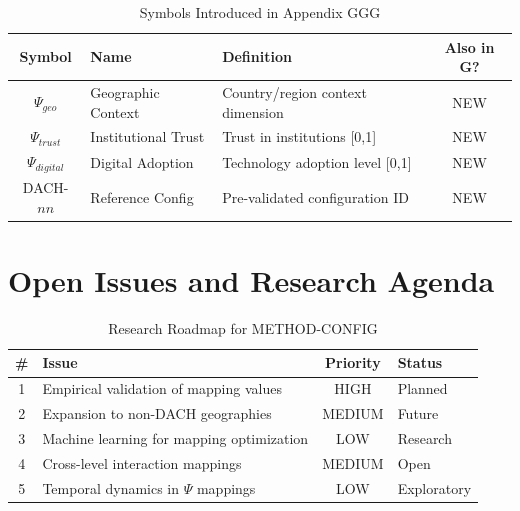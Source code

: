 \vspace{0.5em}

\begin{table}[htbp]
\centering
\caption{Symbols Introduced in Appendix GGG}
\label{tab:ggg-symbols}
\renewcommand{\arraystretch}{1.3}
\begin{tabular}{@{}clp{6cm}c@{}}
\toprule
\textbf{Symbol} & \textbf{Name} & \textbf{Definition} & \textbf{Also in G?} \\
\midrule
$\Psi_{geo}$ & Geographic Context & Country/region context dimension & NEW \\
$\Psi_{trust}$ & Institutional Trust & Trust in institutions [0,1] & NEW \\
$\Psi_{digital}$ & Digital Adoption & Technology adoption level [0,1] & NEW \\
DACH-$nn$ & Reference Config & Pre-validated configuration ID & NEW \\
\bottomrule
\end{tabular}
\end{table}


\section{Open Issues and Research Agenda}
\label{sec:ggg-open}

\begin{table}[htbp]
\centering
\caption{Research Roadmap for METHOD-CONFIG}
\label{tab:ggg-roadmap}
\renewcommand{\arraystretch}{1.3}
\begin{tabular}{@{}clcl@{}}
\toprule
\textbf{\#} & \textbf{Issue} & \textbf{Priority} & \textbf{Status} \\
\midrule
1 & Empirical validation of mapping values & HIGH & Planned \\
2 & Expansion to non-DACH geographies & MEDIUM & Future \\
3 & Machine learning for mapping optimization & LOW & Research \\
4 & Cross-level interaction mappings & MEDIUM & Open \\
5 & Temporal dynamics in $\Psi$ mappings & LOW & Exploratory \\
\bottomrule
\end{tabular}
\end{table}


